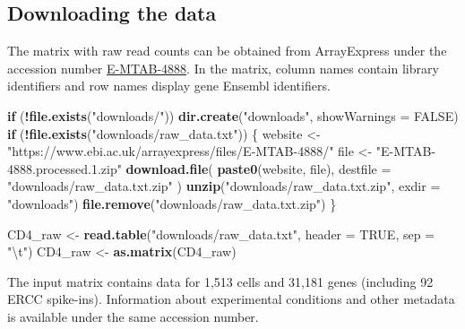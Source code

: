 \documentclass[9pt,a4paper,]{extarticle}
\newenvironment{Shaded}{\begin{snugshade}}{\end{snugshade}}
\newcommand{\CharTok}[1]{\textcolor[rgb]{0.31,0.60,0.02}{#1}}
\newcommand{\ControlFlowTok}[1]{\textcolor[rgb]{0.13,0.29,0.53}{\textbf{#1}}}
\newcommand{\DataTypeTok}[1]{\textcolor[rgb]{0.13,0.29,0.53}{#1}}
\newcommand{\KeywordTok}[1]{\textcolor[rgb]{0.13,0.29,0.53}{\textbf{#1}}}
\newcommand{\NormalTok}[1]{#1}
\newcommand{\OperatorTok}[1]{\textcolor[rgb]{0.81,0.36,0.00}{\textbf{#1}}}
\newcommand{\OtherTok}[1]{\textcolor[rgb]{0.56,0.35,0.01}{#1}}
\newcommand{\StringTok}[1]{\textcolor[rgb]{0.31,0.60,0.02}{#1}}
\begin{document}
\hypertarget{downloading-the-data}{%
\subsection{Downloading the data}\label{downloading-the-data}}

The matrix with raw read counts can be obtained from ArrayExpress under the
accession number
\href{https://www.ebi.ac.uk/arrayexpress/experiments/E-MTAB-4888/}{E-MTAB-4888}.
In the matrix, column names contain library identifiers and row names
display gene Ensembl identifiers.

\begin{Shaded}
\begin{Highlighting}[]
\ControlFlowTok{if}\NormalTok{ (}\OperatorTok{!}\KeywordTok{file.exists}\NormalTok{(}\StringTok{"downloads/"}\NormalTok{))}
  \KeywordTok{dir.create}\NormalTok{(}\StringTok{"downloads"}\NormalTok{, }\DataTypeTok{showWarnings =} \OtherTok{FALSE}\NormalTok{)}
\ControlFlowTok{if}\NormalTok{ (}\OperatorTok{!}\KeywordTok{file.exists}\NormalTok{(}\StringTok{"downloads/raw_data.txt"}\NormalTok{)) \{}
\NormalTok{  website <-}\StringTok{ "https://www.ebi.ac.uk/arrayexpress/files/E-MTAB-4888/"}
\NormalTok{  file <-}\StringTok{ "E-MTAB-4888.processed.1.zip"}
  \KeywordTok{download.file}\NormalTok{(}
    \KeywordTok{paste0}\NormalTok{(website, file),}
    \DataTypeTok{destfile =} \StringTok{"downloads/raw_data.txt.zip"}
\NormalTok{  )}
  \KeywordTok{unzip}\NormalTok{(}\StringTok{"downloads/raw_data.txt.zip"}\NormalTok{, }\DataTypeTok{exdir =} \StringTok{"downloads"}\NormalTok{)}
  \KeywordTok{file.remove}\NormalTok{(}\StringTok{"downloads/raw_data.txt.zip"}\NormalTok{)}
\NormalTok{\}}

\NormalTok{CD4_raw <-}\StringTok{ }\KeywordTok{read.table}\NormalTok{(}\StringTok{"downloads/raw_data.txt"}\NormalTok{, }\DataTypeTok{header =} \OtherTok{TRUE}\NormalTok{, }\DataTypeTok{sep =} \StringTok{"}\CharTok{\textbackslash{}t}\StringTok{"}\NormalTok{)}
\NormalTok{CD4_raw <-}\StringTok{ }\KeywordTok{as.matrix}\NormalTok{(CD4_raw)}
\end{Highlighting}
\end{Shaded}

The input matrix contains data for 1,513
cells and 31,181
genes (including 92 ERCC spike-ins).
Information about experimental conditions and other metadata is available
under the same accession number.
\end{document}

